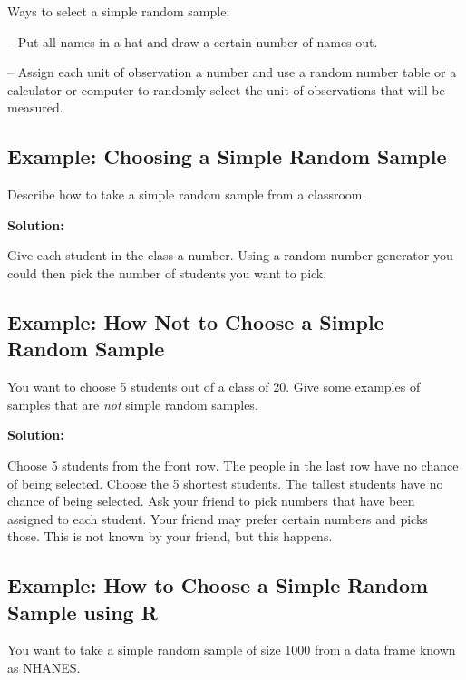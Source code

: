 \documentclass[
]{book}
\begin{document}
Ways to select a simple random sample:

-- Put all names in a hat and draw a certain number of names out.

-- Assign each unit of observation a number and use a random number table or a calculator or computer to randomly select the unit of observations that will be measured.

\hypertarget{example-choosing-a-simple-random-sample}{%
\subsection{Example: Choosing a Simple Random Sample}\label{example-choosing-a-simple-random-sample}}

Describe how to take a simple random sample from a classroom.

\textbf{Solution:}

Give each student in the class a number. Using a random number generator you could then pick the number of students you want to pick.

\hypertarget{example-how-not-to-choose-a-simple-random-sample}{%
\subsection{Example: How Not to Choose a Simple Random Sample}\label{example-how-not-to-choose-a-simple-random-sample}}

You want to choose 5 students out of a class of 20. Give some examples of samples that are \emph{not} simple random samples.

\textbf{Solution:}

Choose 5 students from the front row. The people in the last row have no chance of being selected.
Choose the 5 shortest students. The tallest students have no chance of being selected.
Ask your friend to pick numbers that have been assigned to each student. Your friend may prefer certain numbers and picks those. This is not known by your friend, but this happens.

\hypertarget{example-how-to-choose-a-simple-random-sample-using-r}{%
\subsection{Example: How to Choose a Simple Random Sample using R}\label{example-how-to-choose-a-simple-random-sample-using-r}}

You want to take a simple random sample of size 1000 from a data frame known as NHANES.
\end{document}
